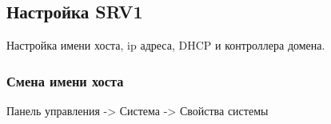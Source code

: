 \documentclass[a4paper, 12pt]{report}
\begin{document}
	\begin{figure}[h]
		\label{fig:image}
	\end{figure}

	\clearpage
	
	\subsection{Настройка SRV1}
	
	Настройка имени хоста, ip адреса, DHCP и контроллера домена.
	
	\subsubsection{Смена имени хоста}
	
	Панель управления -> Система -> Свойства системы
	
	\begin{figure}[h]
		\label{fig:image}
	\end{figure}
\end{document}
